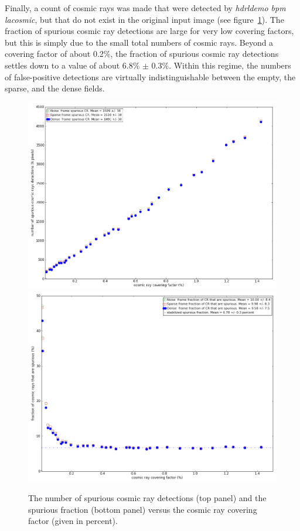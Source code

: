 Finally, a count of cosmic rays was made that were detected by {\em hdrldemo bpm lacosmic}, but that do not exist in the original input image (see figure~\ref{fig:spurious}).
The fraction of spurious cosmic ray detections are large for very low covering factors, but this is simply due to the small total numbers
of cosmic rays.   Beyond a covering factor of about 0.2\%, the fraction of spurious cosmic ray detections settles down to a value of about 6.8\% $\pm$ 0.3\%.
Within this regime, the numbers of false-positive detections are virtually indistinguishable between the empty, the sparse, and the dense
fields.

\vspace*{-0.5cm}
\begin{figure}[b]
 \subfigure
\centering
\includegraphics[width=13.3cm]{figures/LACosmic_spuriousA.png} 
\includegraphics[width=13.3cm]{figures/LACosmic_spuriousB.png}
\caption[]
	{\footnotesize  The number of spurious cosmic ray detections (top panel) and the spurious fraction (bottom panel) versus the cosmic ray covering factor
	(given in percent).
	}
	\label{fig:spurious}
\end{figure}



